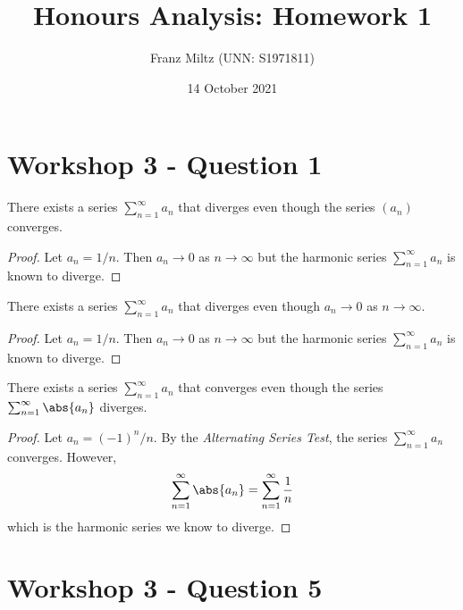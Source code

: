 \documentclass{article}
\begin{document}
\title{Honours Analysis: Homework 1}
\author{Franz Miltz (UNN: S1971811)}
\date{14 October 2021}
\maketitle

\section{Workshop 3 - Question 1}

\begin{claim}
   There exists a series $\sum_{n=1}^\infty a_n$ that diverges even though the 
   series $(a_n)$ converges.
\end{claim}
\begin{proof}
   Let $a_n=1/n$. Then $a_n\to 0$ as $n\to\infty$ but the harmonic series 
   $\sum_{n=1}^\infty a_n$ is known to diverge.
\end{proof}

\begin{claim}
   There exists a series $\sum_{n=1}^\infty a_n$ that diverges even though
   $a_n\to 0$ as $n\to\infty$.
\end{claim}
\begin{proof}
   Let $a_n=1/n$. Then $a_n\to 0$ as $n\to\infty$ but the harmonic series 
   $\sum_{n=1}^\infty a_n$ is known to diverge.
\end{proof}

\begin{claim}
   There exists a series $\sum_{n=1}^\infty a_n$ that converges even though
   the series $\sum_{n=1}^\infty \abs{a_n}$ diverges.
\end{claim}
\begin{proof}
   Let $a_n=(-1)^n/n$. By the \emph{Alternating Series Test}, the series $\sum_{n=1}^\infty a_n$
   converges. However, 
   \begin{align}
      \sum_{n=1}^\infty \abs{a_n} = \sum_{n=1}^\infty \frac{1}{n}
   \end{align}
   which is the harmonic series we know to diverge.
\end{proof}

\section{Workshop 3 - Question 5}
\end{document}
